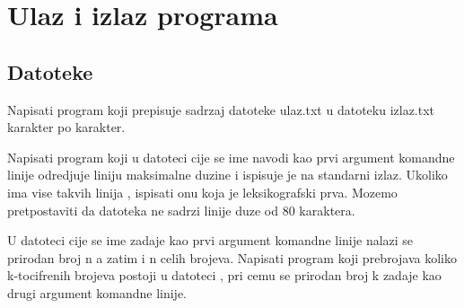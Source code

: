 
\chapter{Ulaz i izlaz programa}



\section{Datoteke}

\begin{Exercise}[label=v3_01] 
Napisati program koji prepisuje sadrzaj datoteke ulaz.txt u
datoteku izlaz.txt karakter po karakter.
\end{Exercise}
\begin{Answer}[ref=v3_01]
\end{Answer}

\begin{Exercise}[label=v3_02] 
Napisati program koji u datoteci cije se ime navodi kao prvi
argument komandne linije odredjuje liniju maksimalne duzine i
ispisuje je na standarni izlaz. Ukoliko ima vise takvih linija ,
ispisati onu koja je leksikografski prva. Mozemo pretpostaviti
da datoteka ne sadrzi linije duze od 80 karaktera.
\end{Exercise}
\begin{Answer}[ref=v3_02]
\end{Answer}

\begin{Exercise}[label=v3_03] 
U datoteci cije se ime zadaje kao prvi argument komandne linije
nalazi se
prirodan broj n a zatim i n celih brojeva. Napisati program koji
prebrojava
koliko k-tocifrenih brojeva postoji u datoteci , pri cemu se
prirodan broj k
zadaje kao drugi argument komandne linije.

\end{Exercise}
\begin{Answer}[ref=v3_03]
\end{Answer}

